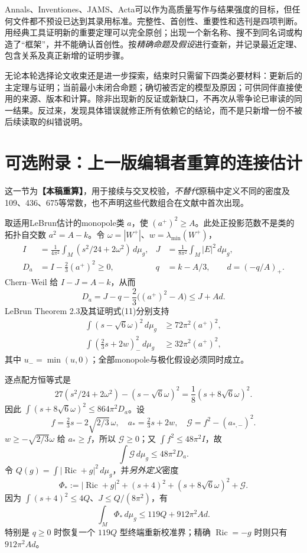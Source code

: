 \documentclass[UTF8,a4paper,11pt,fontset=fandol]{ctexart}
\numberwithin{equation}{section}
\theoremstyle{definition}
\newcommand{\Ric}{\operatorname{Ric}}
\newcommand{\dd}{\,d\mu_g}
\newcommand{\status}[1]{\textbf{【#1】}}
\begin{document}
Annals、Inventiones、JAMS、Acta可以作为高质量写作与结果强度的目标，但任何文件都不预设已达到其录用标准。完整性、首创性、重要性和选刊是四项判断。用经典工具证明新的重要定理可以完全原创；出现一个新名称、搜不到同名词或构造了“框架”，并不能确认首创性。按\emph{精确命题及假设}进行查新，并记录最近定理、包含关系及真正新增的证明步骤。

无论本轮选择论文收束还是进一步探索，结束时只需留下四类必要材料：更新后的主定理与证明；当前最小未闭合命题；确切被否定的模型及原因；可供同伴直接使用的来源、版本和计算。除非出现新的反证或新缺口，不再次从零争论已审读的同一结果。反过来，发现具体错误就修正所有依赖它的结论，而不是只新增一份不被后续读取的纠错说明。

\appendix
\section{可选附录：上一版编辑者重算的连接估计}
这一节为\status{本稿重算}，用于接续与交叉校验，\emph{不替代}原稿中定义不同的密度及109、436、675等常数，也不声明这些代数组合在文献中首次出现。

取适用LeBrun估计的monopole类 $a$，使 $(a^+)^2\ge A$。此处正投影范数不是类的拓扑自交数 $a^2=A-k$。令 $\omega=|W^+|$、$w=\lambda_{\min}(W^+)$，
\begin{align}
 I&=\frac1{4\pi^2}\int_M(s^2/24+2\omega^2)\dd,
 &J&=\frac1{8\pi^2}\int_M|E|^2\dd,\\
 D_a&=I-\frac23(a^+)^2\ge0,
 &q&=k-A/3,\qquad d=(-q/A)_+.
\end{align}
Chern--Weil 给 $I-J=A-k$，从而
\begin{equation}\label{eq:Da}
D_a=J-q-\frac23\big((a^+)^2-A\big)\le J+Ad.
\end{equation}
LeBrun Theorem 2.3及其证明式(11)分别支持
\begin{align}
\int(s-\sqrt6\omega)^2\dd&\ge72\pi^2(a^+)^2,\\
\int\left(\frac23s+2w\right)_{-}^{\!2}\dd&\ge32\pi^2(a^+)^2,
\end{align}
其中 $u_-=\min(u,0)$；全部monopole与极化假设必须同时成立\cite{LeBrun2001}。

逐点配方恒等式是
\begin{equation}\label{eq:square}
27(s^2/24+2\omega^2)-(s-\sqrt6\omega)^2
=\frac18(s+8\sqrt6\omega)^2.
\end{equation}
因此 $\int(s+8\sqrt6\omega)^2\le864\pi^2D_a$。设
\[
f=\tfrac23s-2\sqrt{2/3}\,\omega,\quad a_*=\tfrac23s+2w,
\quad\mathcal G=f^2-(a_{*,-})^2.
\]
$w\ge-\sqrt{2/3}\omega$ 给 $a_*\ge f$，所以 $\mathcal G\ge0$；又 $\int f^2\le48\pi^2I$，故
\begin{equation}
\int\mathcal G\dd\le48\pi^2D_a.
\end{equation}
令 $Q(g)=\int|\Ric+g|^2\dd$，并\emph{另外定义}密度
\begin{equation}\label{eq:Phistar}
\Phi_*:=|\Ric+g|^2+(s+4)^2+(s+8\sqrt6\omega)^2+\mathcal G.
\end{equation}
因为 $\int(s+4)^2\le4Q$、$J\le Q/(8\pi^2)$，有
\begin{equation}\label{eq:119}
\boxed{\int_M\Phi_*\dd\le119Q+912\pi^2 A d.}
\end{equation}
特别是 $q\ge0$ 时恢复一个 $119Q$ 型终端重新校准界；精确 $\Ric=-g$ 时则只有 $912\pi^2Ad$。
\end{document}
